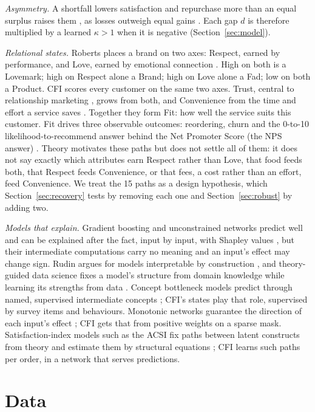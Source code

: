 \documentclass[10pt,twocolumn,letterpaper]{article}
\newcommand{\secref}[1]{Section~\mbox{\ref{#1}}}
\newcommand{\runin}[1]{\textit{#1}\hspace{0.4em}}
\begin{document}
\runin{Asymmetry.} A shortfall lowers satisfaction and repurchase more than an equal surplus raises them \cite{mittal1998}, as losses outweigh equal gains \cite{kahneman1979}. Each gap $d$ is therefore multiplied by a learned $\kappa > 1$ when it is negative (\secref{sec:model}).

\runin{Relational states.} Roberts places a brand on two axes: Respect, earned by performance, and Love, earned by emotional connection \cite{roberts2004}. High on both is a Lovemark; high on Respect alone a Brand; high on Love alone a Fad; low on both a Product. CFI scores every customer on the same two axes. Trust, central to relationship marketing \cite{morgan1994}, grows from both, and Convenience from the time and effort a service saves \cite{berry2002}. Together they form Fit: how well the service suits this customer. Fit drives three observable outcomes: reordering, churn and the 0-to-10 likelihood-to-recommend answer behind the Net Promoter Score (the NPS answer) \cite{reichheld2003}. Theory motivates these paths but does not settle all of them: it does not say exactly which attributes earn Respect rather than Love, that food feeds both, that Respect feeds Convenience, or that fees, a cost rather than an effort, feed Convenience. We treat the 15 paths as a design hypothesis, which \secref{sec:recovery} tests by removing each one and \secref{sec:robust} by adding two.

\runin{Models that explain.} Gradient boosting \cite{friedman2001} and unconstrained networks predict well and can be explained after the fact, input by input, with Shapley values \cite{lundberg2017}, but their intermediate computations carry no meaning and an input's effect may change sign. Rudin argues for models interpretable by construction \cite{rudin2019}, and theory-guided data science fixes a model's structure from domain knowledge while learning its strengths from data \cite{karpatne2017}. Concept bottleneck models predict through named, supervised intermediate concepts \cite{koh2020}; CFI's states play that role, supervised by survey items and behaviours. Monotonic networks guarantee the direction of each input's effect \cite{you2017}; CFI gets that from positive weights on a sparse mask. Satisfaction-index models such as the ACSI fix paths between latent constructs from theory and estimate them by structural equations \cite{fornell1996}; CFI learns such paths per order, in a network that serves predictions.

\section{Data}\label{sec:data}
\end{document}
